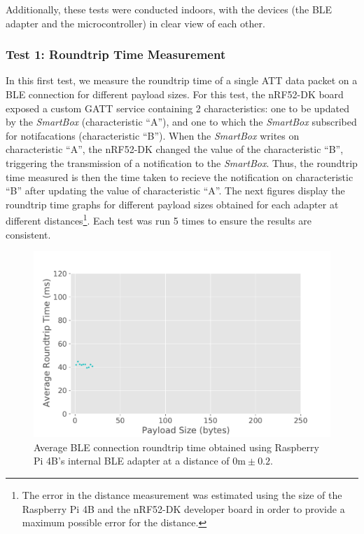 Additionally, these tests were conducted indoors, with the devices (the \acs{BLE} adapter and the microcontroller) in clear view of each other.

\subsubsection{Test 1: Roundtrip Time Measurement}

In this first test, we measure the roundtrip time of a single \acs{ATT} data packet on a \acs{BLE} connection for different payload sizes. For this test, the nRF52-DK board exposed a custom \acs{GATT} service containing 2 characteristics: one to be updated by the \textit{SmartBox} (characteristic ``A''), and one to which the \textit{SmartBox} subscribed for notifacations (characteristic ``B''). When the \textit{SmartBox} writes on characteristic ``A'', the nRF52-DK changed the value of the characteristic ``B'', triggering the transmission of a notification to the \textit{SmartBox}. Thus, the roundtrip time measured is then the time taken to recieve the notification on characteristic ``B'' after updating the value of characteristic ``A''. The next figures display the roundtrip time graphs for different payload sizes obtained for each adapter at different distances\footnote{The error in the distance measurement was estimated using the size of the Raspberry Pi 4B and the nRF52-DK developer board in order to provide a maximum possible error for the distance.}. Each test was run 5 times to ensure the results are consistent.

\begin{figure}[H]
    \centering
    \includegraphics[width=0.75\linewidth]{images/ble-roundtrip-hci1-0cm.pdf}
    \caption[Average \acs{BLE} connection roundtrip time obtained using Raspberry Pi 4B's internal \acs{BLE} adapter at a distance of 0m.]{Average \acs{BLE} connection roundtrip time obtained using Raspberry Pi 4B's internal \acs{BLE} adapter at a distance of $0\text{m} \pm 0.2$.}
    \label{fig:ble-roundtrip-hci1-0m}
\end{figure}

